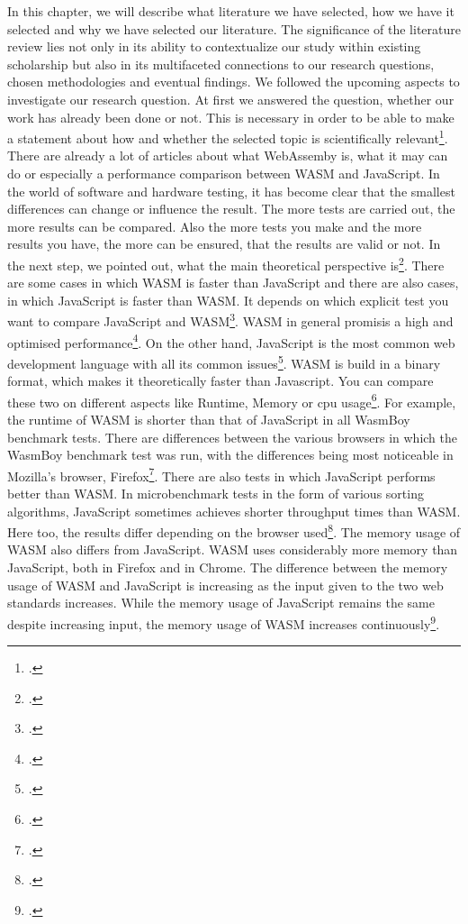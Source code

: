 In this chapter, we will describe what literature we have selected, how we have it selected and why we have selected our literature. 
The significance of the literature review lies not only in its ability to contextualize our study within existing scholarship but also in its multifaceted connections to our research questions, chosen methodologies and eventual findings. We followed the upcoming aspects to investigate our research question.
At first we answered the question, whether our work has already been done or not. This is necessary in order to be able to make a statement about how and whether the selected topic is scientifically relevant\footcite[p.34]{adams_research_2014}. There are already a lot of articles about what WebAssemby is, what it may can do or especially a performance comparison between WASM and JavaScript. In the world of software and hardware testing, it has become clear that the smallest differences can change or influence the result. The more tests are carried out, the more results can be compared. Also the more tests you make and the more results you have, the more can be ensured, that the results are valid or not.
In the next step, we pointed out, what the main theoretical perspective is\footcite[p.34]{adams_research_2014}. There are some cases in which WASM is faster than JavaScript and there are also cases, in which JavaScript is faster than WASM. It depends on which explicit test you want to compare JavaScript and WASM\footcite[p.10]{de_macedo_webassembly_2022}. WASM in general promisis a high and optimised performance\footcite{niehoff_webassembly_nodate}. On the other hand, JavaScript is the most common web development language with all its common issues\footcite{mohit_common_nodate}. WASM is build in a binary format, which makes it theoretically faster than Javascript. You can compare these two  on different aspects like Runtime, Memory or cpu usage\footcite[p.1]{sunarto_systematic_2023}. For example, the runtime of WASM is shorter than that of JavaScript in all WasmBoy benchmark tests. There are differences between the various browsers in which the WasmBoy benchmark test was run, with the differences being most noticeable in Mozilla's browser, Firefox\footcite[p.6]{de_macedo_webassembly_2022}. There are also tests in which JavaScript performs better than WASM. In microbenchmark tests in the form of various sorting algorithms, JavaScript sometimes achieves shorter throughput times than WASM. Here too, the results differ depending on the browser used\footcite[p.5]{de_macedo_webassembly_2022}. The memory usage of WASM also differs from JavaScript. WASM uses considerably more memory than JavaScript, both in Firefox and in Chrome. The difference between the memory usage of WASM and JavaScript is increasing as the input given to the two web standards increases. While the memory usage of JavaScript remains the same despite increasing input, the memory usage of WASM increases continuously\footcite[pp.4]{sunarto_systematic_2023}.
